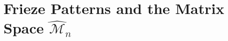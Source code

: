 \documentclass[11pt]{amsart}
\theoremstyle{plain}
\theoremstyle{definition}
\theoremstyle{remark}
\begin{document}


\section{Frieze Patterns and the Matrix Space $\widehat{\mathcal{M}}_n$} \label{section.2}

\end{document}
